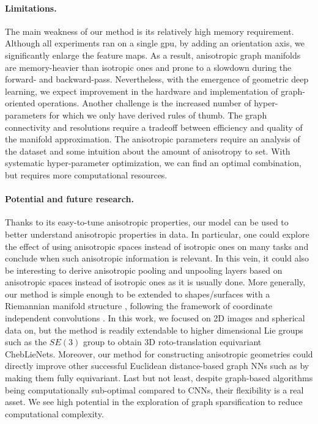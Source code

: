 \documentclass{article}
\begin{document}
\paragraph{Limitations.} The main weakness of our method is its relatively high memory requirement. Although all experiments ran on a single gpu, by adding an orientation axis, we significantly enlarge the feature maps. As a result, anisotropic graph manifolds are memory-heavier than isotropic ones and prone to a slowdown during the forward- and backward-pass. Nevertheless, with the emergence of geometric deep learning, we expect improvement in the hardware and implementation of graph-oriented operations. %
Another challenge is the increased number of hyper-parameters for which we only have derived rules of thumb. The graph connectivity and resolutions require a tradeoff between efficiency and quality of the manifold approximation. The anisotropic parameters require an analysis of the dataset and some intuition about the amount of anisotropy to set. With systematic hyper-parameter optimization, we can find an optimal combination, but requires more computational resources.

\paragraph{Potential and future research.} Thanks to its easy-to-tune anisotropic properties, our model can be used to better understand anisotropic properties in data. In particular, one could explore the effect of using anisotropic spaces instead of isotropic ones on many tasks and conclude when such anisotropic information is relevant. In this vein, it could also be interesting to derive anisotropic pooling and unpooling layers based on anisotropic spaces instead of isotropic ones as it is usually done. More generally, our method is simple enough to be extended to shapes/surfaces with a Riemannian manifold structure \citep{cohen2019gauge}, following the framework of coordinate independent convolutions \citep{weiler2021coordinate}. In this work, we focused on 2D images and spherical data on, but the method is readily extendable to higher dimensional Lie groups such as the $SE(3)$ group to obtain 3D roto-translation equivariant ChebLieNets. Moreover, our method for constructing anisotropic geometries could directly improve other successful Euclidean distance-based graph NNs such as \citep{satorras2021n} by making them fully equivariant. Last but not least, despite graph-based algorithms being computationally sub-optimal compared to CNNs, their flexibility is a real asset. We see high potential in the exploration of graph sparsification to reduce computational complexity. %
\end{document}
